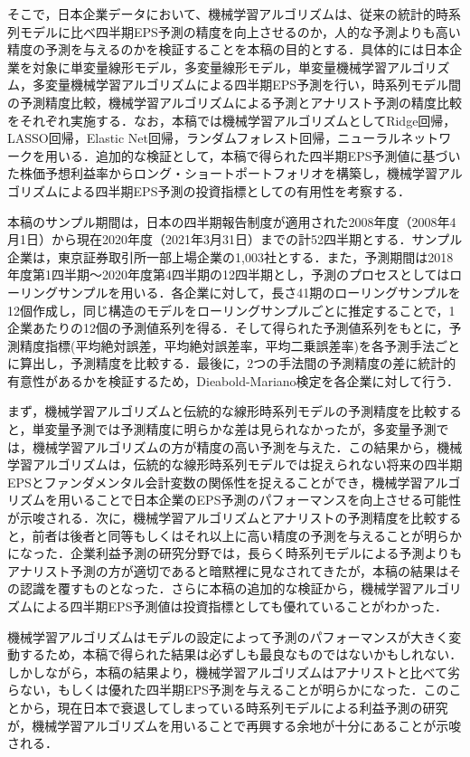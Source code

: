 \documentclass[a4paper，11pt]{jsarticle}
\begin{document}
そこで，日本企業データにおいて、機械学習アルゴリズムは、従来の統計的時系列モデルに比べ四半期EPS予測の精度を向上させるのか，人的な予測よりも高い精度の予測を与えるのかを検証することを本稿の目的とする．具体的には日本企業を対象に単変量線形モデル，多変量線形モデル，単変量機械学習アルゴリズム，多変量機械学習アルゴリズムによる四半期EPS予測を行い，時系列モデル間の予測精度比較，機械学習アルゴリズムによる予測とアナリスト予測の精度比較をそれぞれ実施する．なお，本稿では機械学習アルゴリズムとしてRidge回帰，LASSO回帰，Elastic Net回帰，ランダムフォレスト回帰，ニューラルネットワークを用いる．追加的な検証として，本稿で得られた四半期EPS予測値に基づいた株価予想利益率からロング・ショートポートフォリオを構築し，機械学習アルゴリズムによる四半期EPS予測の投資指標としての有用性を考察する．

本稿のサンプル期間は，日本の四半期報告制度が適用された2008年度（2008年4月1日）から現在2020年度（2021年3月31日）までの計52四半期とする．サンプル企業は，東京証券取引所一部上場企業の1,003社とする．また，予測期間は2018年度第1四半期～2020年度第4四半期の12四半期とし，予測のプロセスとしてはローリングサンプルを用いる．各企業に対して，長さ41期のローリングサンプルを12個作成し，同じ構造のモデルをローリングサンプルごとに推定することで，1企業あたりの12個の予測値系列を得る．そして得られた予測値系列をもとに，予測精度指標(平均絶対誤差，平均絶対誤差率，平均二乗誤差率)を各予測手法ごとに算出し，予測精度を比較する．最後に，2つの手法間の予測精度の差に統計的有意性があるかを検証するため，Dieabold-Mariano検定を各企業に対して行う．

まず，機械学習アルゴリズムと伝統的な線形時系列モデルの予測精度を比較すると，単変量予測では予測精度に明らかな差は見られなかったが，多変量予測では，機械学習アルゴリズムの方が精度の高い予測を与えた．この結果から，機械学習アルゴリズムは，伝統的な線形時系列モデルでは捉えられない将来の四半期EPSとファンダメンタル会計変数の関係性を捉えることができ，機械学習アルゴリズムを用いることで日本企業のEPS予測のパフォーマンスを向上させる可能性が示唆される．次に，機械学習アルゴリズムとアナリストの予測精度を比較すると，前者は後者と同等もしくはそれ以上に高い精度の予測を与えることが明らかになった．企業利益予測の研究分野では，長らく時系列モデルによる予測よりもアナリスト予測の方が適切であると暗黙裡に見なされてきたが，本稿の結果はその認識を覆すものとなった．さらに本稿の追加的な検証から，機械学習アルゴリズムによる四半期EPS予測値は投資指標としても優れていることがわかった．

機械学習アルゴリズムはモデルの設定によって予測のパフォーマンスが大きく変動するため，本稿で得られた結果は必ずしも最良なものではないかもしれない．しかしながら，本稿の結果より，機械学習アルゴリズムはアナリストと比べて劣らない，もしくは優れた四半期EPS予測を与えることが明らかになった．このことから，現在日本で衰退してしまっている時系列モデルによる利益予測の研究が，機械学習アルゴリズムを用いることで再興する余地が十分にあることが示唆される．  
\end{document}
